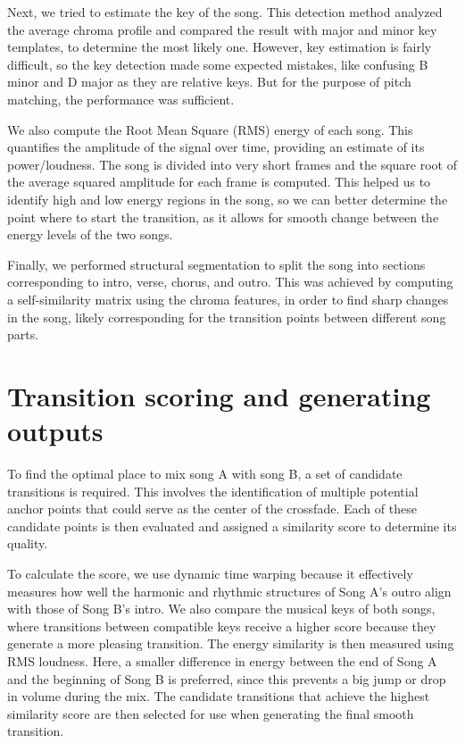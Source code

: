 \documentclass[12pt]{article}
\begin{document}
Next, we tried to estimate the key of the song. This detection method analyzed the average chroma profile and compared the result with major and minor key templates, to determine the most likely one. However, key estimation is fairly difficult, so the key detection made some expected mistakes, like confusing B minor and D major as they are relative keys. But for the purpose of pitch matching, the performance was sufficient.

We also compute the Root Mean Square (RMS) energy of each song. This quantifies the amplitude of the signal over time, providing an estimate of its power/loudness. The song is divided into very short frames and the square root of the average squared amplitude for each frame is computed. This helped us to identify high and low energy regions in the song, so we can better determine the point where to start the transition, as it allows for smooth change between the energy levels of the two songs.

Finally, we performed structural segmentation to split the song into sections corresponding to intro, verse, chorus, and outro. This was achieved by computing a self-similarity matrix using the chroma features, in order to find sharp changes in the song, likely corresponding for the transition points between different song parts. 


\section{Transition scoring and generating outputs}

To find the optimal place to mix song A with song B, a set of candidate transitions is required. This involves the identification of multiple potential anchor points that could serve as the center of the crossfade. Each of these candidate points is then evaluated and assigned a similarity score to determine its quality. 

To calculate the score, we use dynamic time warping because it effectively measures how well the harmonic and rhythmic structures of Song A's outro align with those of Song B's intro. We also compare the musical keys of both songs, where transitions between compatible keys receive a higher score because they generate a more pleasing transition. The energy similarity is then measured using RMS loudness. Here, a smaller difference in energy between the end of Song A and the beginning of Song B is preferred, since this prevents a big jump or drop in volume during the mix. The candidate transitions that achieve the highest similarity score are then selected for use when generating the final smooth transition.
\end{document}
